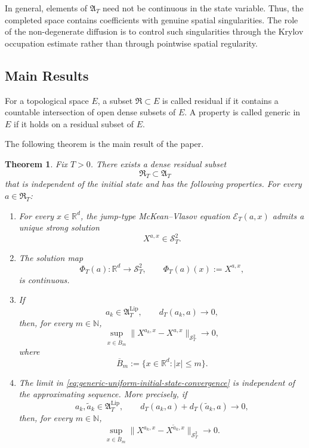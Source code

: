 \documentclass[12pt,oneside, reqno]{amsart}
\newtheorem{theorem}{Theorem}[section]
\numberwithin{equation}{section}
\begin{document}
	In general, elements of $\mathfrak A_T$ need not be continuous in the state variable. Thus, the completed space contains coefficients with genuine spatial singularities. The role of the non-degenerate diffusion is to control such singularities through the Krylov occupation estimate rather than through pointwise spatial regularity.
	
	\subsection{Main Results}
	
	For a topological space $E$, a subset $\mathfrak R\subset E$ is called  residual if it contains a countable intersection of open dense subsets of $E$. A property is called generic in $E$ if it holds on a residual subset of $E$.
	
	The following theorem is the main result of the paper.
	
	
	
	\begin{theorem}
		\label{thm:generic-main-fixed-horizon}
		Fix $T>0$. There exists a dense residual subset
		\[
		\mathfrak R_T\subset\mathfrak A_T
		\]
		that is independent of the initial state and has the following
		properties. For every $a\in\mathfrak R_T$:
		
		\begin{enumerate}
			\item[\textnormal{(i)}]
			For every $x\in\mathbb R^d$, the jump-type McKean--Vlasov
			equation $\mathcal E_T(a,x)$ admits a unique strong solution
			\[
			X^{a,x}\in\mathcal S_T^2.
			\]
			
			\item[\textnormal{(ii)}]
			The solution map
			\[
			\Phi_T(a):\mathbb R^d\longrightarrow\mathcal S_T^2,
			\qquad
			\Phi_T(a)(x):=X^{a,x},
			\]
			is continuous.
			
			\item[\textnormal{(iii)}]
			If
			\[
			a_k\in\mathfrak A_T^{\mathrm{Lip}},
			\qquad
			d_T(a_k,a)\longrightarrow0,
			\]
			then, for every $m\in\mathbb N$,
			\begin{equation}
				\label{eq:generic-uniform-initial-state-convergence}
				\sup_{x\in\overline B_m}
				\|X^{a_k,x}-X^{a,x}\|_{\mathcal S_T^2}
				\longrightarrow0,
			\end{equation}
			where
			\[
			\overline B_m:=\{x\in\mathbb R^d:|x|\leq m\}.
			\]
			
			\item[\textnormal{(iv)}]
			The limit in
			\eqref{eq:generic-uniform-initial-state-convergence}
			is independent of the approximating sequence. More precisely, if
			\[
			a_k,\widetilde a_k\in\mathfrak A_T^{\mathrm{Lip}},
			\qquad
			d_T(a_k,a)+d_T(\widetilde a_k,a)\longrightarrow0,
			\]
			then, for every $m\in\mathbb N$,
			\begin{equation}
				\label{eq:generic-two-uniform-approximations}
				\sup_{x\in\overline B_m}
				\|X^{a_k,x}-X^{\widetilde a_k,x}\|_{\mathcal S_T^2}
				\longrightarrow0.
			\end{equation}
		\end{enumerate}
	\end{theorem}
	
\end{document}
